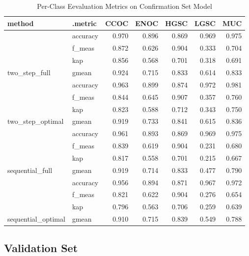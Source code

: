 \documentclass[
]{report}
\begin{document}
\begin{table}

\caption{\label{tab:conf-eval-per-class}Per-Class Eevaluation Metrics on Confirmation Set Model}
\centering
\begin{tabular}[t]{l|l|r|r|r|r|r}
\hline
method & .metric & CCOC & ENOC & HGSC & LGSC & MUC\\
\hline
 & accuracy & 0.970 & 0.896 & 0.869 & 0.969 & 0.975\\
\cline{2-7}
 & f\_meas & 0.872 & 0.626 & 0.904 & 0.333 & 0.704\\
\cline{2-7}
 & kap & 0.856 & 0.568 & 0.701 & 0.318 & 0.691\\
\cline{2-7}
\multirow{-4}{*}{\raggedright\arraybackslash two\_step\_full} & gmean & 0.924 & 0.715 & 0.833 & 0.614 & 0.833\\
\cline{1-7}
 & accuracy & 0.963 & 0.899 & 0.874 & 0.972 & 0.981\\
\cline{2-7}
 & f\_meas & 0.844 & 0.645 & 0.907 & 0.357 & 0.760\\
\cline{2-7}
 & kap & 0.823 & 0.588 & 0.712 & 0.343 & 0.750\\
\cline{2-7}
\multirow{-4}{*}{\raggedright\arraybackslash two\_step\_optimal} & gmean & 0.919 & 0.733 & 0.841 & 0.615 & 0.836\\
\cline{1-7}
 & accuracy & 0.961 & 0.893 & 0.869 & 0.969 & 0.975\\
\cline{2-7}
 & f\_meas & 0.839 & 0.619 & 0.904 & 0.231 & 0.680\\
\cline{2-7}
 & kap & 0.817 & 0.558 & 0.701 & 0.215 & 0.667\\
\cline{2-7}
\multirow{-4}{*}{\raggedright\arraybackslash sequential\_full} & gmean & 0.919 & 0.714 & 0.833 & 0.477 & 0.790\\
\cline{1-7}
 & accuracy & 0.956 & 0.894 & 0.871 & 0.967 & 0.972\\
\cline{2-7}
 & f\_meas & 0.821 & 0.622 & 0.904 & 0.276 & 0.654\\
\cline{2-7}
 & kap & 0.796 & 0.563 & 0.706 & 0.259 & 0.639\\
\cline{2-7}
\multirow{-4}{*}{\raggedright\arraybackslash sequential\_optimal} & gmean & 0.910 & 0.715 & 0.839 & 0.549 & 0.788\\
\hline
\end{tabular}
\end{table}

\hypertarget{validation-set}{%
\subsection{Validation Set}\label{validation-set}}
\end{document}
